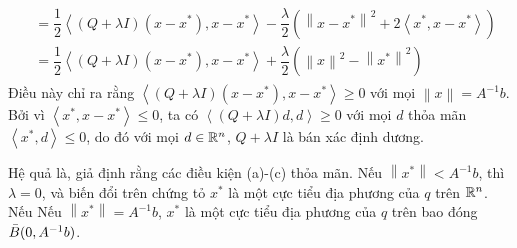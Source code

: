 \begin{solution}
\begin{align}
\begin{aligned}
            &=  \dfrac{1}{2}\left \langle (Q+\lambda I)(x-x^*),  x - x^*\right \rangle - \dfrac{\lambda}{2}(\left \| x - x^* \right \|^2 + 2\left \langle  x^*, x - x^*\right \rangle)\\
            &= \dfrac{1}{2}\left \langle (Q+\lambda I)(x-x^*),  x - x^*\right \rangle  + \dfrac{\lambda}{2}(\left \| x \right \|^2 - \left \| x^* \right \|^2)
        \end{aligned}
    \end{align}
    Điều này chỉ ra rằng $\left \langle (Q+\lambda I)(x-x^*),  x - x^*\right \rangle \geq 0$ với mọi $\left \| x \right \| = A^{-1}b$. Bởi vì $\left \langle  x^*, x - x^*\right \rangle \leq 0$, ta có $\left \langle (Q+\lambda I)d, d \right \rangle \geq 0$ với mọi $d$ thỏa mãn $\left \langle x^*,d \right \rangle \leq 0$, do đó với mọi $d \in \mathbb{R}^n$, $Q + \lambda I$ là bán xác định dương.

    Hệ quả là, giả định rằng các điều kiện (a)-(c) thỏa mãn. Nếu $\left \| x^* \right \| < A^{-1}b$, thì $\lambda = 0$, và biến đổi trên chứng tỏ $x^*$ là một cực tiểu địa phương của $q$ trên $\mathbb{R}^n$. Nếu Nếu $\left \| x^* \right \| = A^{-1}b$, $x^*$ là một cực tiểu địa phương của $q$ trên bao đóng $\Bar{B}(0, A^{-1}b)$.
\end{solution}